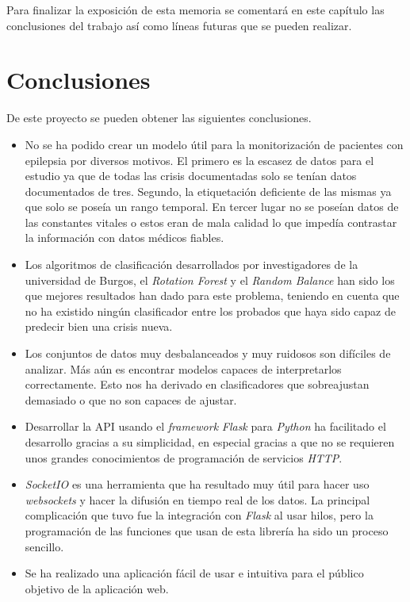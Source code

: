 
Para finalizar la exposición de esta memoria se comentará en este capítulo las conclusiones del trabajo así como líneas futuras que se pueden realizar.

\section{Conclusiones}
De este proyecto se pueden obtener las siguientes conclusiones.
\begin{itemize}
	\item No se ha podido crear un modelo útil para la monitorización de pacientes con epilepsia por diversos motivos. El primero es la escasez de datos para el estudio ya que de todas las crisis documentadas solo se tenían datos documentados de tres. Segundo, la etiquetación deficiente de las mismas ya que solo se poseía un rango temporal. En tercer lugar no se poseían datos de las constantes vitales o estos eran de mala calidad lo que impedía contrastar la información con datos médicos fiables.
	\item Los algoritmos de clasificación desarrollados por investigadores de la universidad de Burgos, el \textit{Rotation Forest} y el \textit{Random Balance} han sido los que mejores resultados han dado para este problema, teniendo en cuenta que no ha existido ningún clasificador entre los probados que haya sido capaz de predecir bien una crisis nueva.
	\item Los conjuntos de datos muy desbalanceados y muy ruidosos son difíciles de analizar. Más aún es encontrar modelos capaces de interpretarlos correctamente. Esto nos ha derivado en clasificadores que sobreajustan demasiado o que no son capaces de ajustar.
	\item Desarrollar la API usando el \textit{framework} \textit{Flask} para \textit{Python} ha facilitado el desarrollo gracias a su simplicidad, en especial gracias a que no se requieren unos grandes conocimientos de programación de servicios \textit{HTTP}.
	\item \textit{SocketIO} es una herramienta que ha resultado muy útil para hacer uso \textit{websockets} y hacer la difusión en tiempo real de los datos. La principal complicación que tuvo fue la integración con \textit{Flask} al usar hilos, pero la programación de las funciones que usan de esta librería ha sido un proceso sencillo. 
	\item Se ha realizado una aplicación fácil de usar e intuitiva para el público objetivo de la aplicación web.
\end{itemize}

